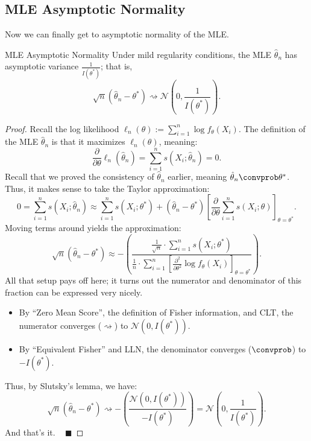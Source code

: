 \subsection{MLE Asymptotic Normality}

Now we can finally get to asymptotic normality of the MLE.

\begin{theorem}{MLE Asymptotic Normality}
    Under mild regularity conditions,
    the MLE $\hat{\theta}_n$ has asymptotic variance $\frac{1}{I(\theta^*)}$; that is,
    \[ \sqrt{n}(\hat{\theta}_n - \theta^*) \rightsquigarrow
    \mathcal{N}\left(0, \frac{1}{I(\theta^*)}\right). \]
\end{theorem}

\begin{proof}
    Recall the log likelihood
    $\ell_n(\theta) := \sum_{i = 1}^n \log f_{\theta}(X_i)$.
    The definition of the MLE $\hat{\theta}_n$ is that it maximizes $\ell_n(\theta)$, meaning:
    \[ \frac{\partial}{\partial\theta} \ell_n(\hat{\theta}_n)
    = \sum_{i = 1}^n s(X_i; \hat{\theta}_n) = 0. \]
    Recall that we proved the consistency of $\hat{\theta}_n$ earlier,
    meaning $\hat{\theta}_n \convprob \theta^*$.
    Thus, it makes sense to take the Taylor approximation:
    \[ 0 = \sum_{i = 1}^n s(X_i; \hat{\theta}_n)
    \approx \sum_{i = 1}^n s(X_i; \theta^*) +
    (\hat{\theta}_n - \theta^*) \left[
        \frac{\partial}{\partial\theta} \sum_{i = 1}^n s(X_i; \theta)
    \right]_{\theta = \theta^*}. \]
    Moving terms around yields the approximation:
    \[ \sqrt{n}(\hat{\theta}_n - \theta^*)
    \approx - \left(\frac{\frac{1}{\sqrt{n}}\cdot \sum_{i = 1}^n s(X_i; \theta^*)}{
        \frac{1}{n} \cdot \sum_{i = 1}^n \left[\frac{\partial^2}{\partial\theta^2} \log f_{\theta}(X_i)
        \right]_{\theta = \theta^*}
    }\right). \]
    All that setup pays off here;
    it turns out the numerator and denominator of this fraction
    can be expressed very nicely.
    \begin{itemize}
        \item By ``Zero Mean Score'', the definition of Fisher information, and CLT,
        the numerator converges ($\rightsquigarrow$) to $\mathcal{N}(0, I(\theta^*))$.
        \item By ``Equivalent Fisher'' and LLN,
        the denominator converges ($\convprob$) to $-I(\theta^*)$.
    \end{itemize}
    Thus, by Slutsky's lemma, we have:
    \[ \sqrt{n}(\hat{\theta}_n - \theta^*) \rightsquigarrow
    -\left(\frac{\mathcal{N}(0, I(\theta^*))}{-I(\theta^*)}\right)
    = \mathcal{N}\left(0, \frac{1}{I(\theta^*)}\right). \]
    And that's it. ~ $\blacksquare$
\end{proof}

